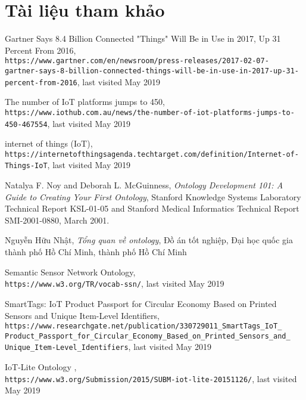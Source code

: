 \clearpage

\chapter{Tài liệu tham khảo}

\begin{thebibliography}{9}

Gartner Says 8.4 Billion Connected "Things" Will Be in Use in 2017, Up 31 Percent From 2016,
\\\texttt{https://www.gartner.com/en/newsroom/press-releases/2017-02-07-\\gartner-says-8-billion-connected-things-will-be-in-use-in-2017-up-31-\\percent-from-2016}, last visited May 2019

 The number of IoT platforms jumps to 450,
\\\texttt{https://www.iothub.com.au/news/the-number-of-iot-platforms-jumps-to-\\450-467554}, last visited May 2019

 internet of things (IoT),
\\\texttt{https://internetofthingsagenda.techtarget.com/definition/Internet-of-\\Things-IoT}, last visited May 2019

 Natalya F. Noy and Deborah L. McGuinness,
\textit{Ontology Development 101: A Guide to Creating Your First Ontology},
Stanford Knowledge Systems Laboratory Technical Report KSL-01-05 and Stanford Medical Informatics Technical Report SMI-2001-0880, March 2001. 

 Nguyễn Hữu Nhật,
\textit{Tổng quan về ontology},
Đồ án tốt nghiệp, Đại học quốc gia thành phố Hồ Chí Minh, thành phố Hồ Chí Minh

 Semantic Sensor Network Ontology,
\\\texttt{https://www.w3.org/TR/vocab-ssn/}, last visited May 2019


 SmartTags: IoT Product Passport for Circular Economy Based on Printed Sensors and Unique Item-Level Identifiers,
\\\texttt{https://www.researchgate.net/publication/330729011\_SmartTags\_IoT\_\\Product\_Passport\_for\_Circular\_Economy\_Based\_on\_Printed\_Sensors\_and\_\\Unique\_Item-Level\_Identifiers}, last visited May 2019

  IoT-Lite Ontology ,
\\\texttt{https://www.w3.org/Submission/2015/SUBM-iot-lite-20151126/}, last visited May 2019

\end{thebibliography}

